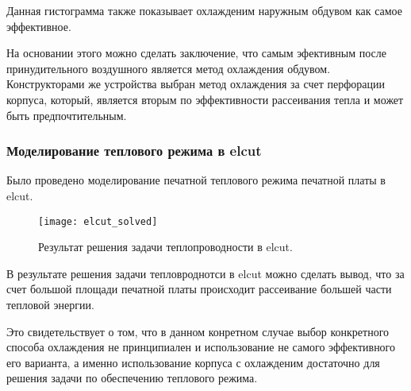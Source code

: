 Данная гистограмма также показывает охлажденим наружным обдувом как
самое эффективное.

На основании этого можно сделать заключение, что самым эфективным
после принудительного воздушного является метод охлаждения обдувом.
Конструкторами же устройства выбран метод охлаждения за счет
перфорации корпуса, который, является вторым по эффективности рассеивания тепла
и может быть предпочтительным.

\subsubsection{Моделирование теплового режима в elcut}

Было проведено моделирование печатной теплового режима печатной платы
в elcut.


\begin{figure}[h]
  \centering
  \texttt{[image: elcut\_solved]}
  \caption{
    Результат решения задачи теплопроводности в elcut. }
\end{figure}

В результате решения задачи тепловроднотси в elcut можно сделать
вывод, что за счет большой площади печатной платы происходит
рассеивание большей части тепловой энергии.

Это свидетельствует о том, что в данном конретном случае выбор
конкретного способа охлаждения не принципиален и использование не
самого эффективного его варианта, а именно использование корпуса с
охлажденим достаточно для решения задачи по обеспечению теплового
режима. 